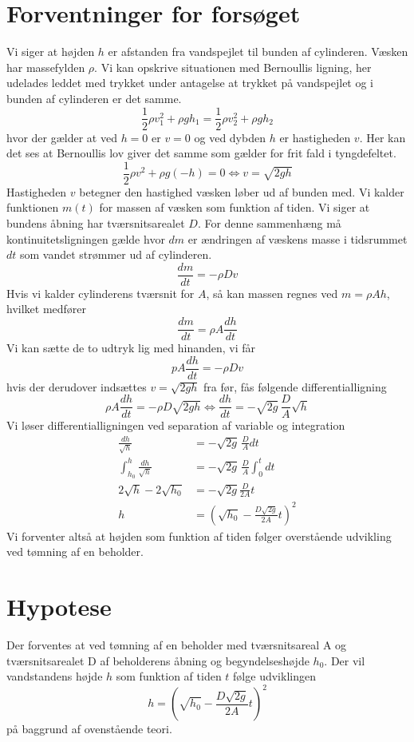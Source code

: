 \documentclass[a4paper, 11pt]{article}
\begin{document}
\section{Forventninger for forsøget}
Vi siger at højden \(h\) er afstanden fra vandspejlet til bunden af cylinderen. Væsken har massefylden \(\rho\). Vi kan opskrive situationen med Bernoullis ligning, her udelades leddet med trykket under antagelse at trykket på vandspejlet og i bunden af cylinderen er det samme.
\begin{equation}
    \frac{1}{2}\rho v_1^2+\rho g h_1 = \frac{1}{2}\rho v_2^2+\rho g h_2
\end{equation}
hvor der gælder at ved \(h=0\) er \(v=0\) og ved dybden \(h\) er hastigheden \(v\).
Her kan det ses at Bernoullis lov giver det samme som gælder for frit fald i tyngdefeltet.
\begin{equation}
    \frac{1}{2}\rho v^2+\rho g (-h)=0 \Leftrightarrow v=\sqrt{2gh}
\end{equation}
Hastigheden \(v\) betegner den hastighed væsken løber ud af bunden med. 
Vi kalder funktionen \(m(t)\) for massen af væsken som funktion af tiden. Vi siger at bundens åbning har tværsnitsarealet \(D\).
For denne sammenhæng må kontinuitetsligningen gælde hvor \(dm\) er ændringen af væskens masse i tidsrummet \(dt\) som vandet strømmer ud af cylinderen.
\[\frac{dm}{dt}=-\rho Dv\]
Hvis vi kalder cylinderens tværsnit for \(A\), så kan massen regnes ved \(m=\rho A h\), hvilket medfører
\[\frac{dm}{dt}= \rho A \frac{dh}{dt}\]
Vi kan sætte de to udtryk lig med hinanden, vi får
\[pA \frac{dh}{dt}=-\rho Dv\]
hvis der derudover indsættes \(v=\sqrt{2gh}\) fra før, fås følgende differentialligning
\begin{equation}
    \rho A \frac{dh}{dt} = -\rho D \sqrt{2gh} \Leftrightarrow \frac{dh}{dt} = -\sqrt{2g}\, \frac{D}{A}\sqrt{h} 
\end{equation}
Vi løser differentialligningen ved separation af variable og integration
\begin{align*}
    \frac{dh}{\sqrt{h}}&=-\sqrt{2g}\,\frac{D}{A}dt\\
    \int_{h_0}^{h}\frac{dh}{\sqrt{h}}&=-\sqrt{2g}\,\frac{D}{A} \int_0^t dt\\
    2\sqrt{h}-2\sqrt{h_0}&=-\sqrt{2g}\frac{D}{2A}t\\
    h&=\left(\sqrt{h_0}-\frac{D\sqrt{2g}}{2A}t\right)^2
\end{align*} 
Vi forventer altså at højden som funktion af tiden følger overstående udvikling ved tømning af en beholder.
\section{Hypotese}
Der forventes at ved tømning af en beholder med tværsnitsareal A og tværsnitsarealet D af beholderens åbning og begyndelseshøjde \(h_0\). Der vil vandstandens højde \(h\) som funktion af tiden \(t\) følge udviklingen
\begin{equation}
    h=\left(\sqrt{h_0}-\frac{D\sqrt{2g}}{2A}t\right)^2
\end{equation}
på baggrund af ovenstående teori.
\clearpage
\end{document}
